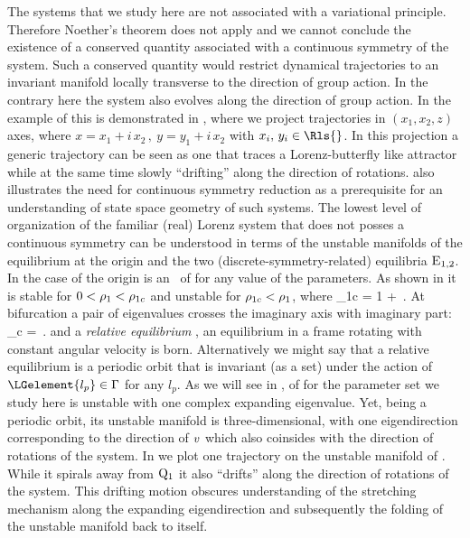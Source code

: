 The systems that we study here are not associated with a variational principle. Therefore
Noether's theorem does not apply and we  cannot conclude the existence of a conserved quantity associated
with a continuous symmetry of the system. Such a conserved quantity would restrict dynamical
trajectories to an invariant manifold locally transverse to the direction of group action.
In the contrary here the system also evolves along the direction of group action. In the example of {\CLe}
this is demonstrated in , where we project trajectories in $(x_1,x_2,z)$ axes,
where $x=x_1+ i\, x_2\,,\ y=y_1+i\, x_2$ with $x_i,\,y_i\in\Rls{}$. In this projection a generic
trajectory can be seen as one that traces a Lorenz-butterfly like attractor while at the same time slowly
``drifting'' along the direction of rotations.  also illustrates the need for continuous symmetry
reduction as a prerequisite for an understanding of state space geometry of such systems.
The lowest level of organization of the familiar (real) Lorenz system that does not posses a continuous symmetry
can be understood in terms of the unstable manifolds of the equilibrium at the origin
and the two (discrete-symmetry-related) equilibria $\mathrm{E}_{1,2}$. In the case of {\CLe}  the origin 
is an \eqv\ of  for any
value of the parameters. As shown in  it
is stable for $0<\rho_1<\rho_{1c}$ and unstable for
$\rho_{1c}<\rho_1$, where
\beq
	\rho_{1c} = 1 + \,.
\eeq
At bifurcation a pair of eigenvalues crosses the imaginary axis with imaginary part:
\beq
	\omega_c = \,.
	\label{eq:omegaCLE}
\eeq
and a \emph{relative equilibrium} , an equilibrium in a frame rotating with constant angular velocity
is born. Alternatively we might say that a relative equilibrium is a periodic orbit that is invariant (as a set)
under the action of $\LGelement{l_p}\in\Group$ for any $l_p$.
  As we will see in ,  of {\CLe} for
the parameter set we study here is unstable with one complex expanding eigenvalue. Yet, being a periodic
orbit, its unstable manifold is three-dimensional, with one eigendirection corresponding
to the direction of $v$ which also coinsides with the direction of rotations of the system.
In  we plot one trajectory on the unstable manifold of . While it spirals away
from $\mathrm{Q}_{1}$ it also ``drifts'' along the direction of rotations of the system. This drifting motion obscures
understanding of the stretching mechanism along the expanding eigendirection and subsequently the folding of the
unstable manifold back to itself.

